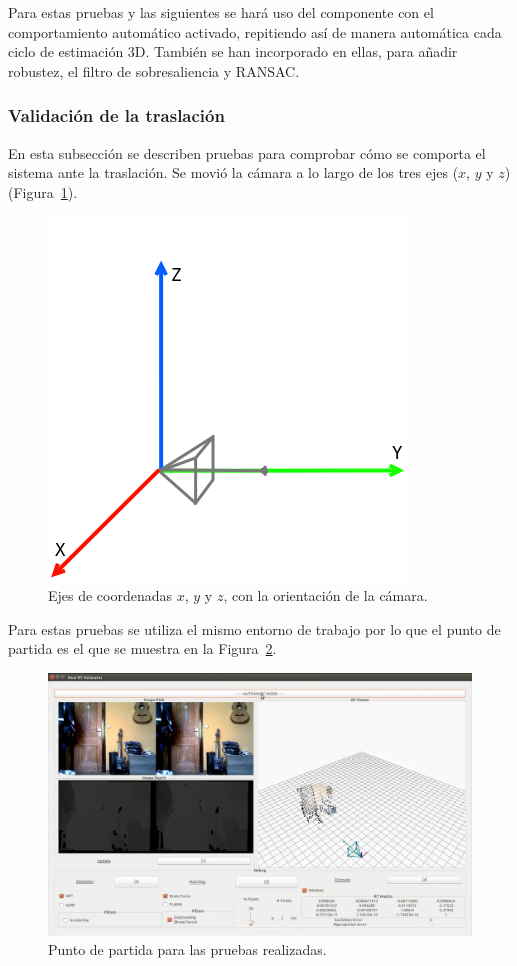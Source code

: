 Para estas pruebas y las siguientes se hará uso del componente con el comportamiento automático activado, repitiendo así de manera automática cada ciclo de estimación 3D. También se han incorporado en ellas, para añadir robustez, el filtro de sobresaliencia y RANSAC.

\subsubsection{Validación de la traslación}

En esta subsección se describen pruebas para comprobar cómo se comporta el sistema ante la traslación. Se movió la cámara a lo largo de los tres ejes ($x$, $y$ y $z$) (Figura~\ref{fig:xyz}).

\begin{figure}[th]
\centering
\includegraphics[scale=0.3]{Figures/xyz.png}
\decoRule
\caption[Ejes de coordenadas $x$, $y$ y $z$]{Ejes de coordenadas $x$, $y$ y $z$, con la orientación de la cámara.}
\label{fig:xyz}
\end{figure}

Para estas pruebas se utiliza el mismo entorno de trabajo por lo que el punto de partida es el que se muestra en la Figura~\ref{fig:init}.

\begin{figure}[th]
\centering
\includegraphics[scale=0.35]{Figures/tests/init.png}
\decoRule
\caption[Punto de partida para las pruebas de traslación y rotación]{Punto de partida para las pruebas realizadas.}
\label{fig:init}
\end{figure}

